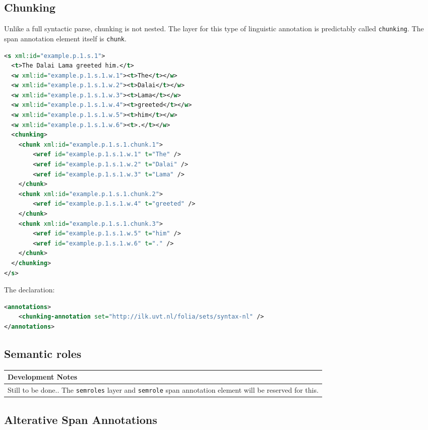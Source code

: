 \documentclass[a4paper,12pt]{report}
\newenvironment{devnotes}
{
\begin{center}
    \begin{tabular}[h!]{|p{0.8\textwidth}|}
    \hline
    {\bf Development Notes}\\\hline}
{   \\\hline
    \end{tabular}
\end{center}}
\begin{document}
\subsection{Chunking}

Unlike a full syntactic parse, chunking is not nested. The layer for this type of linguistic annotation is predictably called \texttt{chunking}. The span annotation element itself is \texttt{chunk}.

\begin{lstlisting}[language=xml]
<s xml:id="example.p.1.s.1">
  <t>The Dalai Lama greeted him.</t>
  <w xml:id="example.p.1.s.1.w.1"><t>The</t></w>
  <w xml:id="example.p.1.s.1.w.2"><t>Dalai</t></w>
  <w xml:id="example.p.1.s.1.w.3"><t>Lama</t></w>
  <w xml:id="example.p.1.s.1.w.4"><t>greeted</t></w>
  <w xml:id="example.p.1.s.1.w.5"><t>him</t></w>
  <w xml:id="example.p.1.s.1.w.6"><t>.</t></w>
  <chunking>
    <chunk xml:id="example.p.1.s.1.chunk.1">       
        <wref id="example.p.1.s.1.w.1" t="The" />       
        <wref id="example.p.1.s.1.w.2" t="Dalai" />       
        <wref id="example.p.1.s.1.w.3" t="Lama" />        
    </chunk>
    <chunk xml:id="example.p.1.s.1.chunk.2">       
        <wref id="example.p.1.s.1.w.4" t="greeted" />
    </chunk>
    <chunk xml:id="example.p.1.s.1.chunk.3">       
        <wref id="example.p.1.s.1.w.5" t="him" />
        <wref id="example.p.1.s.1.w.6" t="." />
    </chunk>    
  </chunking>
</s>
\end{lstlisting}


The declaration:

\begin{lstlisting}[language=xml]
<annotations>
    <chunking-annotation set="http://ilk.uvt.nl/folia/sets/syntax-nl" />
</annotations>
\end{lstlisting}



\subsection{Semantic roles}

\begin{devnotes}
Still to be done.. The \texttt{semroles} layer and \texttt{semrole} span annotation element will be reserved for this.
\end{devnotes}

\subsection{Alterative Span Annotations}
\end{document}
